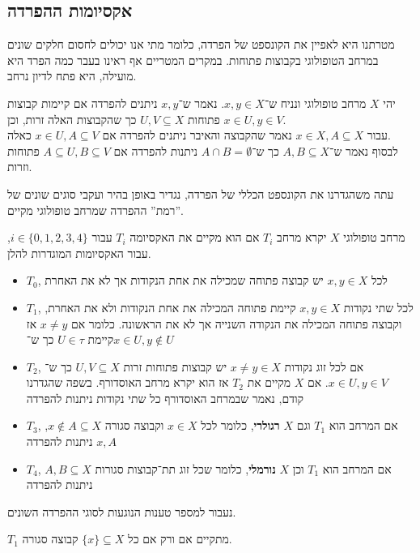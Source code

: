 \subsection{אקסיומות ההפרדה}
מטרתנו היא לאפיין את הקונספט של הפרדה,
כלומר מתי אנו יכולים לחסום חלקים שונים במרחב הטופולוגי בקבוצות פתוחות.
במקרים המטריים אף ראינו בעבר כמה הפרד היא מועילה, היא פתח לדיון נרחב.
\begin{definition}
	יהי $X$ מרחב טופולוגי ונניח ש־$x, y \in X$.
	נאמר ש־$x, y$ ניתנים להפרדה אם קיימות קבוצות פתוחות $U, V \subseteq X$ כך שהקבוצות האלה זרות, וכן $x \in U, y \in V$. \\
	עבור $x \in X, A \subseteq X$ נאמר שהקבוצה והאיבר ניתנים להפרדה אם $x \in U, A \subseteq V$ כאלה. \\
	לבסוף נאמר ש־$A, B \subseteq X$ כך ש־$A \cap B = \emptyset$ ניתנות להפרדה אם $A \subseteq U, B \subseteq V$ פתוחות וזרות.
\end{definition}
עתה משהגדרנו את הקונספט הכללי של הפרדה, נגדיר באופן בהיר ועקבי סוגים שונים של ''רמת'' ההפרדה שמרחב טופולוגי מקיים.
\begin{definition}
	מרחב טופולוגי $X$ יקרא מרחב $T_i$ אם הוא מקיים את האקסיומה $T_i$ עבור $i \in \{0, 1, 2, 3, 4\}$, עבור האקסיומות המוגדרות להלן.
	\begin{itemize}
		\item $T_0$, לכל $x, y \in X$ יש קבוצה פתוחה שמכילה את אחת הנקודות אך לא את האחרת
		\item $T_1$, לכל שתי נקודות $x, y \in X$ קיימת פתוחה המכילה את אחת הנקודות ולא את האחרת, וקבוצה פתוחה המכילה את הנקודה השנייה אך לא את הראשונה.
			כלומר אם $x \ne y$ אז קיימת $U \in \tau$ כך ש־$x \in U, y \notin U$
		\item $T_2$, אם לכל זוג נקודות $x \ne y \in X$ יש קבוצות פתוחות זרות $U, V \subseteq X$ כך ש־$x \in U, y \in V$.
			אם $X$ מקיים את $T_2$ אז הוא יקרא מרחב האוסדורף.
			בשפה שהגדרנו קודם, נאמר שבמרחב האוסדורף כל שתי נקודות ניתנות להפרדה
		\item $T_3$, אם המרחב הוא $T_1$ וגם $X$ \textbf{רגולרי},
			כלומר לכל $x \in X$ וקבוצה סגורה $x \notin A \subseteq X$, $x, A$ ניתנות להפרדה
		\item $T_4$, אם המרחב הוא $T_1$ וכן $X$ \textbf{נורמלי},
			כלומר שכל זוג תת־קבוצות סגורות $A, B \subseteq X$ ניתנות להפרדה
	\end{itemize}
\end{definition}
נעבור למספר טענות הנוגעות לסוגי ההפרדה השונים.
\begin{proposition}
	$T_1$ מתקיים אם ורק אם כל $\{x\} \subseteq X$ קבוצה סגורה.
\end{proposition}
